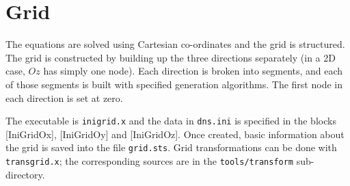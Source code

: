 \chapter{Grid}\label{sec:grid}

The equations are solved using Cartesian co-ordinates and the grid is structured. The grid is constructed by building up the three directions separately (in a 2D case, $Oz$ has simply one node).  Each direction is broken into segments, and each of those segments is built with specified generation algorithms. The first node in each direction is set at zero. 

The executable is {\tt inigrid.x} and the data in {\tt dns.ini} is specified in the blocks [IniGridOx], [IniGridOy] and [IniGridOz]. Once created, basic information about the grid is saved into the file {\tt grid.sts}. Grid transformations can be done with {\tt transgrid.x}; the corresponding sources are in the {\tt tools/transform} sub-directory. 


